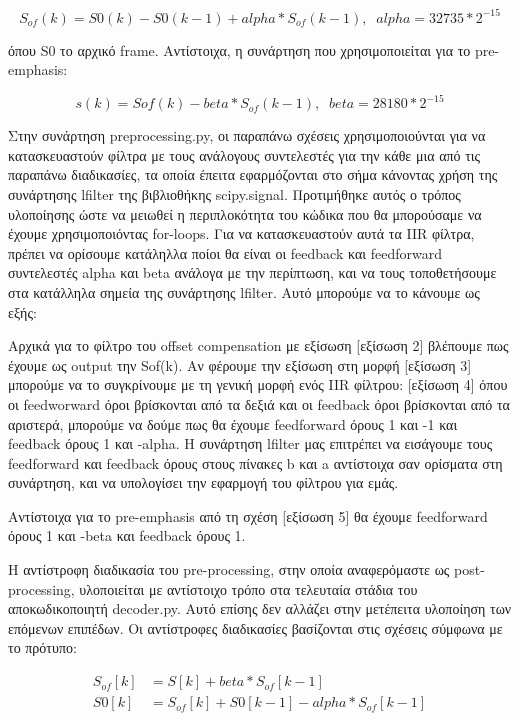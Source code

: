 \documentclass{article}
\begin{document}
\begin{equation}
    S_{of}(k) = S0(k) - S0 (k-1) + alpha*S_{of}(k-1),\;\; alpha = 32735*2^{-15}
\end{equation}

όπου S0 το αρχικό frame.
Αντίστοιχα, η συνάρτηση που χρησιμοποιείται για το pre-emphasis:

\begin{equation}
    s(k)=Sof(k)-beta*S_{of}(k-1),\;\; beta=28180*2^{-15}
\end{equation}

Στην συνάρτηση preprocessing.py, οι παραπάνω σχέσεις χρησιμοποιούνται
για να κατασκευαστούν φίλτρα με τους ανάλογους συντελεστές για την κάθε 
μια από τις παραπάνω διαδικασίες, τα οποία έπειτα εφαρμόζονται 
στο σήμα κάνοντας χρήση της συνάρτησης lfilter της βιβλιοθήκης scipy.signal. 
Προτιμήθηκε αυτός ο τρόπος υλοποίησης ώστε να μειωθεί η περιπλοκότητα του κώδικα 
που θα μπορούσαμε να έχουμε χρησιμοποιόντας for-loops. Για να κατασκευαστούν 
αυτά τα IIR φίλτρα, πρέπει να ορίσουμε κατάληλλα ποίοι θα είναι οι feedback 
και feedforward συντελεστές alpha και beta ανάλογα με την περίπτωση,
και να τους τοποθετήσουμε στα κατάλληλα σημεία της συνάρτησης lfilter. 
Αυτό μπορούμε να το κάνουμε ως εξής:

Αρχικά για το φίλτρο του offset compensation με εξίσωση 
[εξίσωση 2] 
βλέπουμε πως έχουμε ως output την Sof(k).
Αν φέρουμε την εξίσωση στη μορφή 
[εξίσωση 3]
μπορούμε να το συγκρίνουμε με τη γενική μορφή ενός IIR φίλτρου:
[εξίσωση 4]
όπου οι feedworward όροι βρίσκονται από τα δεξιά και οι feedback όροι βρίσκονται από τα αριστερά,
μπορούμε να δούμε πως θα έχουμε feedforward όρους 1 και -1 και feedback όρους 1 και -alpha.
Η συνάρτηση lfilter μας επιτρέπει να εισάγουμε τους feedforward και feedback όρους στους πίνακες b και a αντίστοιχα
σαν ορίσματα στη συνάρτηση, και να υπολογίσει την εφαρμογή του φίλτρου για εμάς.

Αντίστοιχα για το pre-emphasis από τη σχέση 
[εξίσωση 5]
θα έχουμε feedforward όρους 1 και -beta και feedback όρους 1.

Η αντίστροφη διαδικασία του pre-processing, στην οποία αναφερόμαστε ως post-processing, 
υλοποιείται με αντίστοιχο τρόπο στα τελευταία στάδια του αποκωδικοποιητή decoder.py.
Αυτό επίσης δεν αλλάζει στην μετέπειτα υλοποίηση των επόμενων επιπέδων. Οι 
αντίστροφες διαδικασίες βασίζονται στις σχέσεις σύμφωνα με το πρότυπο:

\begin{align}
    S_{of}[k] &= S[k] + beta * S_{of}[k-1] \\ 
    S0[k]& = S_{of}[k] + S0[k−1] − alpha*S_{of}[k−1] 
\end{align}
\end{document}
